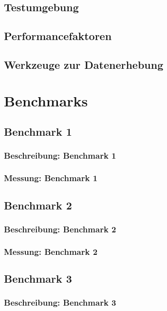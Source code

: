 \documentclass[fontsize=12pt,paper=a4,twoside=semi,parskip=half-,headsepline,headinclude]{scrreprt}
\begin{document}
\section{Testumgebung}

\section{Performancefaktoren}

\section{Werkzeuge zur Datenerhebung}

\chapter{Benchmarks}

\section{Benchmark 1}

\subsection{Beschreibung: Benchmark 1}

\subsection{Messung: Benchmark 1}

\section{Benchmark 2}

\subsection{Beschreibung: Benchmark 2}

\subsection{Messung: Benchmark 2}

\section{Benchmark 3}

\subsection{Beschreibung: Benchmark 3}
\end{document}
